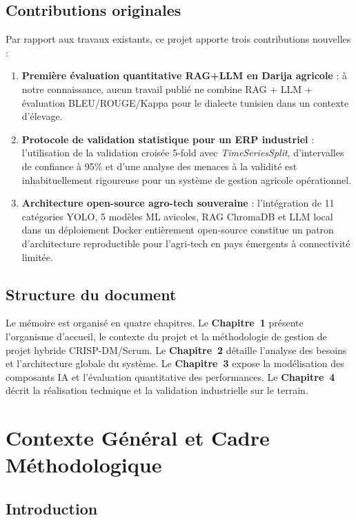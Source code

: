 \documentclass[12pt,a4paper,twoside]{report}
\newcounter{hi}
\begin{document}
\section*{Contributions originales}
Par rapport aux travaux existants, ce projet apporte trois contributions nouvelles :
\begin{enumerate}
  \item \textbf{Première évaluation quantitative RAG+LLM en Darija agricole} :
        à notre connaissance, aucun travail publié ne combine RAG + LLM + évaluation
        BLEU/ROUGE/Kappa pour le dialecte tunisien dans un contexte d'élevage.
  \item \textbf{Protocole de validation statistique pour un ERP industriel} :
        l'utilisation de la validation croisée 5-fold avec \textit{TimeSeriesSplit},
        d'intervalles de confiance à 95\% et d'une analyse des menaces à la validité
        est inhabituellement rigoureuse pour un système de gestion agricole opérationnel.
  \item \textbf{Architecture open-source agro-tech souveraine} : l'intégration de
        11 catégories YOLO, 5 modèles ML avicoles, RAG ChromaDB et LLM local dans
        un déploiement Docker entièrement open-source constitue un patron d'architecture
        reproductible pour l'agri-tech en pays émergents à connectivité limitée.
\end{enumerate}

\section*{Structure du document}
Le mémoire est organisé en quatre chapitres. Le \textbf{Chapitre~1} présente
l'organisme d'accueil, le contexte du projet et la méthodologie de gestion
de projet hybride CRISP-DM/Scrum. Le \textbf{Chapitre~2} détaille l'analyse
des besoins et l'architecture globale du système. Le \textbf{Chapitre~3}
expose la modélisation des composants IA et l'évaluation quantitative des
performances. Le \textbf{Chapitre~4} décrit la réalisation technique et
la validation industrielle sur le terrain.

\chapter{Contexte Général et Cadre Méthodologique}
\section*{Introduction}
\end{document}
